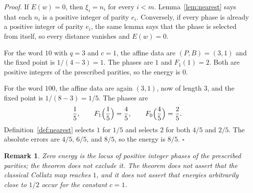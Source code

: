 \documentclass[11pt,letterpaper]{article}
\newtheorem{remark}[theorem]{Remark}
\newenvironment{proof}{\noindent\textit{Proof.}}{\hfill\(\square\)}
\begin{document}
\begin{proof}
If \(E(w)=0\), then \(\xi_i=n_i\) for every \(i<m\). Lemma~\ref{lem:nearest} says that each \(n_i\) is a positive integer of parity \(e_i\). Conversely, if every phase is already a positive integer of parity \(e_i\), the same lemma says that the phase is selected from itself, so every distance vanishes and \(E(w)=0\).

For the word \(10\) with \(q=3\) and \(c=1\), the affine data are \((P,B)=(3,1)\) and the fixed point is \(1/(4-3)=1\). The phases are \(1\) and \(F_1(1)=2\). Both are positive integers of the prescribed parities, so the energy is \(0\).

For the word \(100\), the affine data are again \((3,1)\), now of length \(3\), and the fixed point is \(1/(8-3)=1/5\). The phases are
\[
\frac15,\qquad
F_1\Bigl(\frac15\Bigr)=\frac45,\qquad
F_0\Bigl(\frac45\Bigr)=\frac25.
\]
Definition~\ref{def:nearest} selects \(1\) for \(1/5\) and selects \(2\) for both \(4/5\) and \(2/5\). The absolute errors are \(4/5\), \(6/5\), and \(8/5\), so the energy is \(8/5\).
\end{proof}

\begin{remark}
Zero energy is the locus of positive integer phases of the prescribed parities; the theorem does not exclude it. The theorem does not assert that the classical Collatz map reaches \(1\), and it does not assert that energies arbitrarily close to \(1/2\) occur for the constant \(c=1\).
\end{remark}
\end{document}
